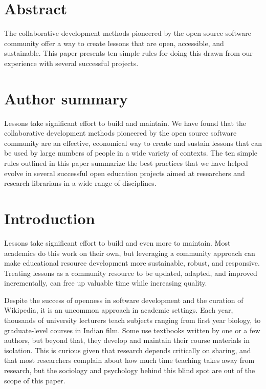 \documentclass[10pt,letterpaper]{article}
\begin{document}

\linenumbers

\section*{Abstract}

The collaborative development methods pioneered by the open source software community
offer a way to create lessons that are open, accessible, and sustainable.
This paper presents ten simple rules for doing this
drawn from our experience with several successful projects.

\section*{Author summary}

Lessons take significant effort to build and  maintain.
We have found that
the collaborative development methods pioneered by the open source software community
are an effective, economical way to create and sustain lessons
that can be used by large numbers of people in a wide variety of contexts.
The ten simple rules outlined in this paper
summarize the best practices that we have helped evolve
in several successful open education projects aimed at researchers and research librarians
in a wide range of disciplines.


\section*{Introduction}

Lessons take significant effort to build and even more to maintain.
Most academics do this work on their own,
but leveraging a community approach
can make educational resource development more sustainable, robust, and responsive.
Treating lessons as a community resource
to be updated, adapted, and improved incrementally,
can free up valuable time while increasing quality.

Despite the success of openness in software development and the curation of Wikipedia,
it is an uncommon approach in academic settings.
Each year,
thousands of university lecturers teach subjects ranging from first year biology,
to graduate-level courses in Indian film.
Some use textbooks written by one or a few authors,
but beyond that,
they develop and maintain their course materials in isolation.
This is curious given that research depends critically on sharing,
and that most researchers complain about how much time teaching takes away from research,
but the sociology and psychology behind this blind spot are out of the scope of this paper.
\end{document}
